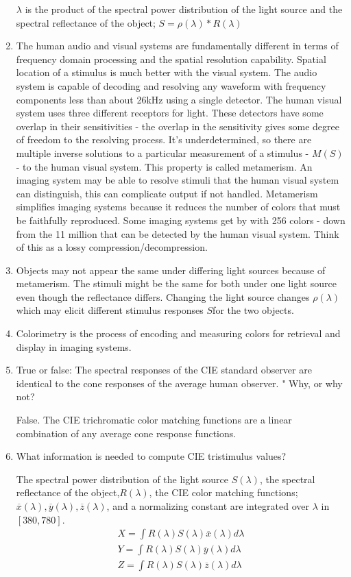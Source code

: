 \documentclass{amsart}
\theoremstyle{definition}
\theoremstyle{remark}
\numberwithin{equation}{section}
\begin{document}
\begin{enumerate}
$\lambda$ is the product of the spectral power distribution of the
light source and the spectral reflectance of the object;
$S=\rho(\lambda)*R(\lambda)$ \item The human audio and visual
systems are fundamentally different in terms of frequency domain
processing and the spatial resolution capability. Spatial location
of a stimulus is much better with the visual system.  The audio
system is capable of decoding and resolving any waveform with
frequency components less than about 26kHz using a single
detector.  The human visual system uses three different receptors
for light. These detectors have some overlap in their
sensitivities - the overlap in the sensitivity gives some degree
of freedom to the resolving process. It's underdetermined, so
there are multiple inverse solutions to a particular measurement
of a stimulus - $M(S)$ - to the human visual system. This property
is called metamerism.  An imaging system may be able to resolve
stimuli that the human visual system can distinguish, this can
complicate output if not handled. Metamerism simplifies imaging
systems because it reduces the number of colors that must be
faithfully reproduced.  Some imaging systems get by with 256
colors - down from the 11 million that can be detected by the
human visual system.  Think of this as a lossy
compression/decompression. \item Objects may not appear the same
under differing light sources because of metamerism.  The stimuli
might be the same for both under one light source even though the
reflectance differs. Changing the light source changes
$\rho(\lambda)$ which may elicit different stimulus responses
$S$for the two objects. \item Colorimetry is the process of
encoding and measuring colors for retrieval and display in imaging
systems.

\item  True or false: The spectral responses of the CIE standard
observer are identical to the cone responses of the average human
observer. "   Why, or why not? \par  False.  The CIE trichromatic
color matching functions are a linear combination of any average
cone response functions.

\item What information is needed to compute CIE tristimulus
values? \par The spectral power distribution of the light source
\(S(\lambda)\), the spectral reflectance of the
object,\(R(\lambda)\), the CIE color matching functions;
\begin{math}\overline{x}(\lambda),\overline{y}(\lambda),\overline{z}(\lambda)
\end{math}, and a normalizing constant are integrated over \(
\lambda \) in \( [380,780] \).
\begin{eqnarray}
 \nonumber X = \int R(\lambda) S(\lambda) \overline{x}(\lambda) d\lambda \\
 \nonumber Y = \int R(\lambda) S(\lambda) \overline{y}(\lambda)
d\lambda \\ \nonumber Z = \int R(\lambda) S(\lambda)
\overline{z}(\lambda) d\lambda
\end{eqnarray}


\end{enumerate}
\end{document}
